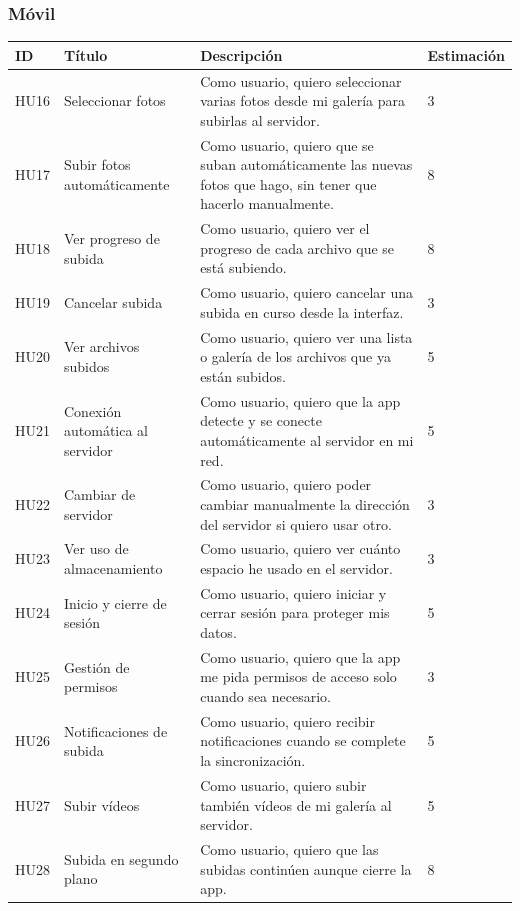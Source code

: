 \subsubsection{Móvil} 
\begin{tabularx}{\textwidth}{|l|l|>{\raggedright\arraybackslash}X|l|}
    \hline
    ID & Título & Descripción & Estimación \\
    \hline
    HU16 & Seleccionar fotos & Como usuario, quiero seleccionar varias fotos desde mi galería para subirlas al servidor. & 3 \\
    \hline
    HU17 & Subir fotos automáticamente & Como usuario, quiero que se suban automáticamente las nuevas fotos que hago, sin tener que hacerlo manualmente. & 8 \\
    \hline
    HU18 & Ver progreso de subida & Como usuario, quiero ver el progreso de cada archivo que se está subiendo. & 8 \\
    \hline
    HU19 & Cancelar subida & Como usuario, quiero cancelar una subida en curso desde la interfaz. & 3 \\
    \hline
    HU20 & Ver archivos subidos & Como usuario, quiero ver una lista o galería de los archivos que ya están subidos. & 5 \\
    \hline
    HU21 & Conexión automática al servidor & Como usuario, quiero que la app detecte y se conecte automáticamente al servidor en mi red. & 5 \\
    \hline
    HU22 & Cambiar de servidor & Como usuario, quiero poder cambiar manualmente la dirección del servidor si quiero usar otro. & 3 \\
    \hline
    HU23 & Ver uso de almacenamiento & Como usuario, quiero ver cuánto espacio he usado en el servidor. & 3 \\
    \hline
    HU24 & Inicio y cierre de sesión & Como usuario, quiero iniciar y cerrar sesión para proteger mis datos. & 5 \\
    \hline
    HU25 & Gestión de permisos & Como usuario, quiero que la app me pida permisos de acceso solo cuando sea necesario. & 3 \\
    \hline
    HU26 & Notificaciones de subida & Como usuario, quiero recibir notificaciones cuando se complete la sincronización. & 5 \\
    \hline
    HU27 & Subir vídeos & Como usuario, quiero subir también vídeos de mi galería al servidor. & 5 \\
    \hline
    HU28 & Subida en segundo plano & Como usuario, quiero que las subidas continúen aunque cierre la app. & 8 \\

\end{tabularx}
